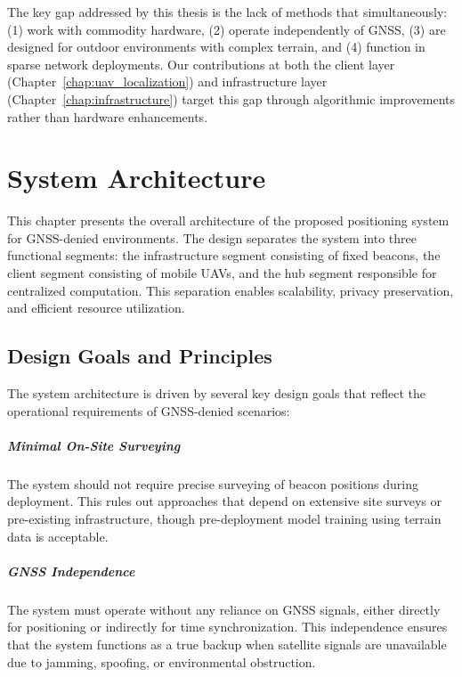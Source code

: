 \documentclass[master,final,11pt]{iscs-thesis}
\begin{document}
The key gap addressed by this thesis is the lack of methods that simultaneously: (1) work with commodity hardware, (2) operate independently of GNSS, (3) are designed for outdoor environments with complex terrain, and (4) function in sparse network deployments.
Our contributions at both the client layer (Chapter~\ref{chap:uav_localization}) and infrastructure layer (Chapter~\ref{chap:infrastructure}) target this gap through algorithmic improvements rather than hardware enhancements.

\chapter{System Architecture}
\label{chap:architecture}

This chapter presents the overall architecture of the proposed positioning system for GNSS-denied environments.
The design separates the system into three functional segments: the infrastructure segment consisting of fixed beacons, the client segment consisting of mobile UAVs, and the hub segment responsible for centralized computation.
This separation enables scalability, privacy preservation, and efficient resource utilization.

\section{Design Goals and Principles}
\label{sec:design_goals}

The system architecture is driven by several key design goals that reflect the operational requirements of GNSS-denied scenarios:

\paragraph{Minimal On-Site Surveying}
The system should not require precise surveying of beacon positions during deployment.
This rules out approaches that depend on extensive site surveys or pre-existing infrastructure, though pre-deployment model training using terrain data is acceptable.

\paragraph{GNSS Independence}
The system must operate without any reliance on GNSS signals, either directly for positioning or indirectly for time synchronization.
This independence ensures that the system functions as a true backup when satellite signals are unavailable due to jamming, spoofing, or environmental obstruction.
\end{document}
